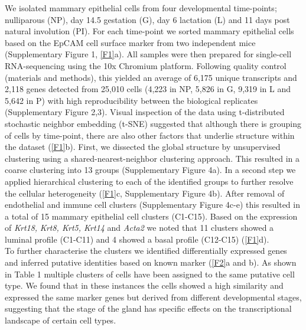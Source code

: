 \documentclass[titlepage, 12pt, oneside]{amsart}
\begin{document}
We isolated mammary epithelial cells from four developmental time-points; nulliparous (NP), day 14.5 gestation (G), day 6 lactation (L) and 11 days post natural involution (PI).
For each time-point we sorted mammary epithelial cells based on the EpCAM cell surface marker from two independent mice (Supplementary Figure 1, \autoref{F1}a).
All samples were then prepared for single-cell RNA-sequencing using the 10x Chromium platform\autocite{Zheng2017}.
Following quality control (materials and methods), this yielded an average of 6,175 unique transcripts and 2,118 genes detected from 25,010 cells (4,223 in NP, 5,826 in G, 9,319 in L and 5,642 in P) with high reproducibility between the biological replicates (Supplementary Figure 2,3).
Visual inspection of the data using t-distributed stochastic neighbor embedding (t-SNE) suggested that although there is grouping of cells by time-point, there are also other factors that underlie structure within the dataset (\autoref{F1}b).
First, we dissected the global structure by unsupervised clustering using a shared-nearest-neighbor clustering approach.
This resulted in a coarse clustering into 13 groups (Supplementary Figure 4a).
In a second step we applied hierarchical clustering to each of the identified groups to further resolve the cellular heterogeneity (\autoref{F1}c, Supplementary Figure 4b).
After removal of endothelial and immune cell clusters (Supplementary Figure 4c-e) this resulted in a total of 15 mammary epithelial cell clusters (C1-C15).
Based on the expression of \textit{Krt18,} \textit{Krt8, Krt5, Krt14} and \textit{Acta2} we noted that 11 clusters showed a luminal profile (C1-C11) and 4 showed a basal profile (C12-C15) (\autoref{F1}d).\\

To further characterise the clusters we identified differentially expressed genes and inferred putative identities based on known marker (\autoref{F2}a and b).
As shown in Table 1 multiple clusters of cells have been assigned to the same putative cell type.
We found that in these instances the cells showed a high similarity and expressed the same marker genes but derived from different developmental stages, suggesting that the stage of the gland has specific effects on the transcriptional landscape of certain cell types.\\
\end{document}
